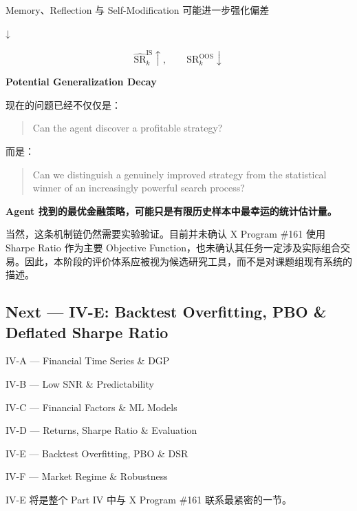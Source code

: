 Memory、Reflection 与 Self-Modification 可能进一步强化偏差

↓

\[\widehat{\mathrm{SR}}_k^{\mathrm{IS}}\uparrow,\qquad\mathrm{SR}_k^{\mathrm{OOS}}\downarrow\]

\textbf{Potential Generalization Decay}

现在的问题已经不仅仅是：

\begin{quote}
Can the agent discover a profitable strategy?
\end{quote}

而是：

\begin{quote}
Can we distinguish a genuinely improved strategy from the statistical winner of an increasingly powerful search process?
\end{quote}

\textbf{Agent 找到的最优金融策略，可能只是有限历史样本中最幸运的统计估计量。}

当然，这条机制链仍然需要实验验证。目前并未确认 X Program \#161 使用 Sharpe Ratio 作为主要 Objective Function，也未确认其任务一定涉及实际组合交易。因此，本阶段的评价体系应被视为候选研究工具，而不是对课题组现有系统的描述。

\hypertarget{part-4-67-0001-next-iv-e-backtest-overfitting-pbo-deflated-sharpe-ratio}{%
\subsection{Next --- IV-E: Backtest Overfitting, PBO \& Deflated Sharpe Ratio}\label{part-4-67-0001-next-iv-e-backtest-overfitting-pbo-deflated-sharpe-ratio}}

IV-A --- Financial Time Series \& DGP

IV-B --- Low SNR \& Predictability

IV-C --- Financial Factors \& ML Models

IV-D --- Returns, Sharpe Ratio \& Evaluation

IV-E --- Backtest Overfitting, PBO \& DSR

IV-F --- Market Regime \& Robustness

IV-E 将是整个 Part IV 中与 X Program \#161 联系最紧密的一节。

